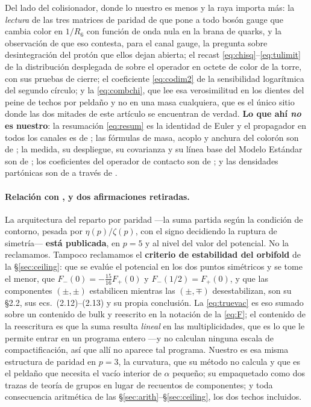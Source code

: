 \documentclass[11pt,a4paper]{article}
\begin{document}
\noindent Del lado del colisionador, donde lo nuestro es menos y la raya importa más: la
\emph{lectura} de las tres matrices de paridad de \cite{KM25} que pone a todo bosón gauge que
cambia color en $1/R_6$ con función de onda nula en la brana de quarks, y la observación de que eso
contesta, para el canal gauge, la pregunta sobre desintegración del protón que ellos dejan abierta;
el recast \eqref{eq:chisq}--\eqref{eq:tulimit} de la distribución desplegada de \cite{CMSangular}
sobre el operador en octete de color de la torre, con sus pruebas de cierre; el coeficiente
\eqref{eq:codim2} de la sensibilidad logarítmica del segundo círculo; y la \eqref{eq:combchi}, que
lee esa verosimilitud en los dientes del peine de techos por peldaño y no en una masa
cualquiera, que es el
único sitio donde las dos mitades de este artículo se encuentran de verdad. \textbf{Lo que ahí
\emph{no} es nuestro}: la resumación \eqref{eq:resum} es la identidad de Euler y el propagador en
todos los canales es de \cite{DMN01}; las fórmulas de masa, acoplo y anchura del colorón son de
\cite{Simmons97}; la medida, su despliegue, su covarianza y su línea base del Modelo Estándar son
de \cite{CMSangular}; los coeficientes del operador de contacto son de \cite{CIJET}; y las
densidades partónicas son de \cite{CT10,NNPDF31,CT14} a través de \cite{LHAPDF}.

\paragraph{Relación con \cite{CCD24}, y dos afirmaciones retiradas.} La arquitectura del reparto
por paridad ---la suma partida según la condición de contorno, pesada por $\eta(p)/\zeta(p)$, con el
signo decidiendo la ruptura de simetría--- \textbf{está publicada}, en $p=5$ y al nivel del valor del
potencial. No la reclamamos. Tampoco reclamamos el \textbf{criterio de estabilidad del orbifold} de
la \S\ref{sec:ceiling}: que se evalúe el potencial en los dos puntos simétricos y se tome el menor,
que $F_-(0)=-\tfrac{15}{16}F_+(0)$ y $F_-(1/2)=F_+(0)$, y que las componentes $(\pm,\pm)$
estabilicen mientras las $(\pm,\mp)$ desestabilizan, son su \S2.2, sus ecs.~(2.12)--(2.13) y su
propia conclusión. La \eqref{eq:truevac} es eso sumado sobre un contenido de bulk y reescrito en la
notación de la \eqref{eq:F}; el contenido de la reescritura es que la suma resulta \emph{lineal} en
las multiplicidades, que es lo que le permite entrar en un programa entero ---y \cite{CCD24} no
calculan ninguna escala de compactificación, así que allí no aparece tal programa. Nuestro es esa
misma estructura de paridad en $p=3$, la curvatura, que su método no calcula y que es el peldaño que
necesita el vacío interior de $\alpha$ pequeño; su empaquetado como dos trazas de teoría de grupos
en lugar de recuentos de componentes; y toda consecuencia aritmética de las
\S\ref{sec:arith}--\S\ref{sec:ceiling}, los dos techos incluidos.
\end{document}

